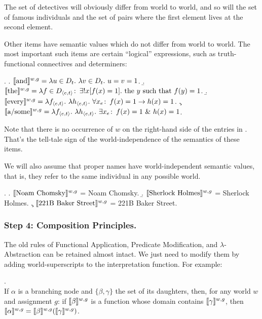 The set of detectives will obviously differ from world to world, and
so will the set of famous individuals and the set of pairs where the
first element lives at the second element.

Other items have semantic values which do not differ from world to
world. The most important such items are certain ``logical''
expressions, such as truth-functional connectives and
determiners:

\ex. \a.
$\llbracket \mbox{and} \rrbracket^{w,g} = \lambda u \in D_t.\ \lambda v \in D_t.\ u=v=1
$.
\b.
$\llbracket \mbox{the} \rrbracket^{w,g} = \lambda f \in D_{\langle e,t \rangle}\colon\thinspace \exists !
x[f(x) = 1]. \mbox{ the } y \mbox{ such that } f(y) = 1$.
\b.
$\llbracket \mbox{every} \rrbracket^{w,g} = \lambda f_{\langle e,t \rangle}.\ \lambda
h_{\langle e,t \rangle}.\ \forall x_e\colon\thinspace f(x) = 1 \rightarrow h(x) = 1 $.
 \c.
$\llbracket \mbox{a/some} \rrbracket^{w,g} = \lambda f_{\langle e,t \rangle}.\ \lambda
h_{\langle e,t \rangle}.\ \exists x_e\colon\thinspace f(x) = 1\ \&\ h(x) = 1 $.

Note that there is no occurrence of $w$ on the right-hand side of the
entries in \Last. That's the tell-tale sign of the world-independence
of the semantics of these items.

We will also assume that proper names have world-independent semantic
values, that is, they refer to the same individual in any possible
world.

\ex. \a. $\llbracket \mbox{Noam Chomsky} \rrbracket^{w,g}$ = Noam Chomsky. 
\b. $\llbracket \mbox{Sherlock Holmes} \rrbracket^{w,g}$ = Sherlock Holmes. 
\c. $\llbracket \mbox{221B Baker Street} \rrbracket^{w,g}$ = 221B Baker Street.

\subsubsection{Step 4: Composition Principles.} \label{sec:comp-princ}

The old rules of Functional Application, Predicate Modification, and
$\lambda$-Abstraction can be retained almost intact. We just need to
modify them by adding world-superscripts to the interpretation
function. For example:

\ex. \\
If $\alpha$ is a branching node and $\{\beta, \gamma\}$ the set of its
daughters, then, for any world $w$ and assignment $g$: if
$\llbracket \beta \rrbracket^{w,g}$ is a function whose domain contains
$\llbracket \gamma \rrbracket^{w,g}$, then
$\llbracket \alpha \rrbracket^{w,g} = \llbracket \beta \rrbracket^{w,g} (\llbracket \gamma \rrbracket^{w,g})$.

